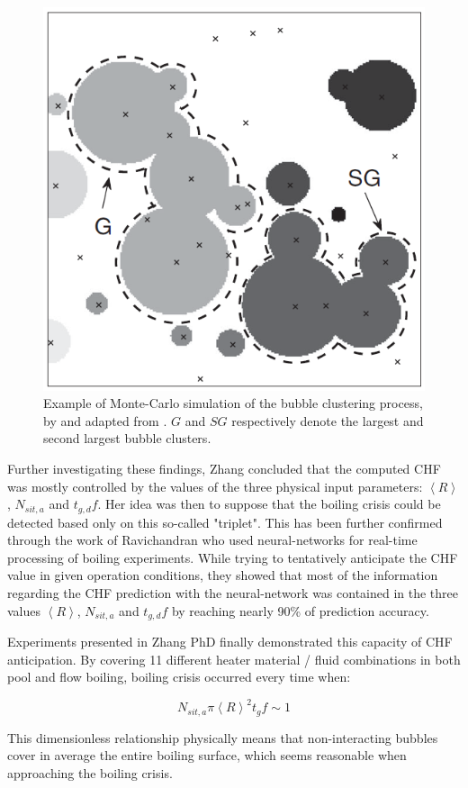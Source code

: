 \begin{figure}[!h]
\centering
\includegraphics[width=0.35\linewidth]{img/chf/chf_zhang_cluster.png}
\caption{Example of Monte-Carlo simulation of the bubble clustering process, by and adapted from \cite{zhang_percolative_2019}. $G$ and $SG$ respectively denote the largest and second largest bubble clusters.}
\label{fig:chf_zhang_cluster}
\end{figure}

\npar

Further investigating these findings, Zhang \cite{zhang_new_2022} concluded that the computed CHF was mostly controlled by the values of the three physical input parameters:  $\left<R\right>$, $N_{sit,a}$ and $t_{g,d}f$. Her idea was then to suppose that the boiling crisis could be detected based only on this so-called "triplet". This has been further confirmed through the work of Ravichandran \etal \cite{ravichandran_online_2019, ravichandran_infrared_2022} who used neural-networks for real-time processing of boiling experiments. While trying to tentatively anticipate the CHF value in given operation conditions, they showed that most of the information regarding the CHF prediction with the neural-network was contained in the three values $\left<R\right>$, $N_{sit,a}$ and $t_{g,d}f$ by reaching nearly 90\% of prediction accuracy.

\npar

Experiments presented in Zhang PhD \cite{zhang_new_2022} finally demonstrated this capacity of CHF anticipation. By covering 11 different heater material / fluid combinations in both pool and flow boiling, boiling crisis occurred every time when:

\begin{equation}
N_{sit,a} \pi \left<R\right>^{2} t_{g}f \sim 1
\label{eq:chf_zang}
\end{equation}

This dimensionless relationship physically means that non-interacting bubbles cover in average the entire boiling surface, which seems reasonable when approaching the boiling crisis.


